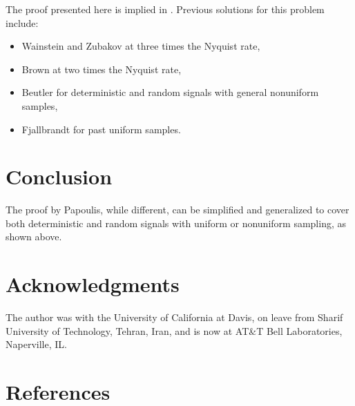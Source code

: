 \documentclass{article}
\begin{document}
The proof presented here is implied in {\cite{requicha1980}}. Previous
solutions for this problem include:
\begin{itemize}
  \item Wainstein and Zubakov {\cite{wainstein1962}} at three times the
  Nyquist rate,
  
  \item Brown {\cite{brown1972}} at two times the Nyquist rate,
  
  \item Beutler {\cite{beutler1966}} for deterministic and random signals with
  general nonuniform samples,
  
  \item Fjallbrandt {\cite{fjallbrandt1975}} for past uniform samples.
\end{itemize}

\section{Conclusion}

The proof by Papoulis, while different, can be simplified and generalized to
cover both deterministic and random signals with uniform or nonuniform
sampling, as shown above.

\section*{Acknowledgments}

The author was with the University of California at Davis, on leave from
Sharif University of Technology, Tehran, Iran, and is now at AT\&T Bell
Laboratories, Naperville, IL.

\section*{References}
\end{document}

